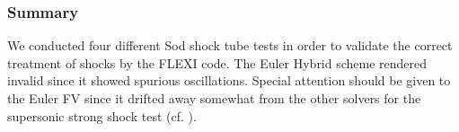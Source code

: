 \subsubsection{Summary}
We conducted four different Sod shock tube tests in order to validate the
correct treatment of shocks by the FLEXI code. The Euler Hybrid scheme rendered
invalid since it showed spurious oscillations. Special attention should be
given to the Euler FV since it drifted away somewhat from the other solvers
for the supersonic strong shock test (cf.
).
